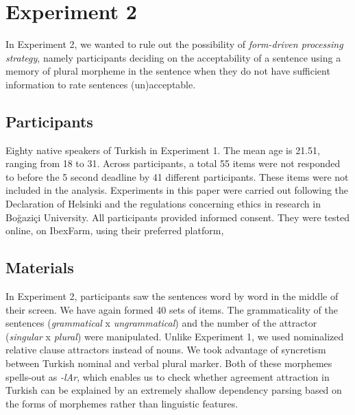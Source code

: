 \documentclass[doc,a4paper,man,natbib,floatsintext,noextraspace]{apa6}\usepackage[]{graphicx}\usepackage[]{color}
\begin{document}
\section{Experiment 2} \label{sec:exp2}







In Experiment 2, we wanted to rule out the possibility of \textit{form-driven processing strategy}, namely participants deciding on the acceptability of a sentence using a memory of plural morpheme in the sentence when they do not have sufficient information to rate sentences (un)acceptable. 
 

\subsection{Participants} \label{sec:exp2:participants}

Eighty native speakers of Turkish in Experiment 1. The mean age is 21.51, ranging from 18 to 31. Across participants, a total 55 items were not responded to before the 5 second deadline by 41 different participants. These items were not included in the analysis. Experiments in this paper were carried out following the Declaration of Helsinki and the regulations concerning ethics in research in Bo\u{g}azi\c{c}i University. All participants provided informed consent. They were tested online, on IbexFarm, using their preferred platform, %


\subsection{Materials} \label{sec:exp2:materials}

In Experiment 2, participants saw the sentences word by word in the middle of their screen. We have again formed 40 sets of items. The grammaticality of the sentences (\textit{grammatical} x \textit{ungrammatical}) and the number of the attractor (\textit{singular} x \textit{plural}) were manipulated. Unlike Experiment 1, we used nominalized relative clause attractors instead of nouns. We took advantage of syncretism between Turkish nominal and verbal plural marker. Both of these morphemes spells-out as \textit{-lAr}, which enables us to check whether agreement attraction in Turkish can be explained by an extremely shallow dependency parsing based on the forms of morphemes rather than linguistic features.
\end{document}

